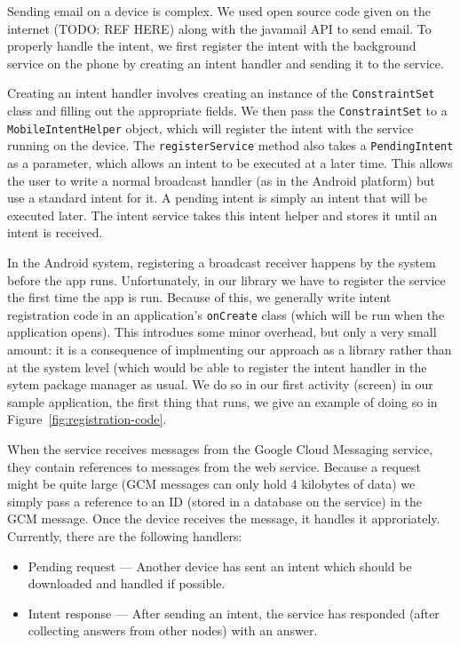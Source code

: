 \documentclass{acm_proc_article-sp}
\begin{document}
Sending email on a device is complex.  We used open source code given
on the internet (TODO: REF HERE) along with the javamail API to send
email.  To properly handle the intent, we first register the intent
with the background service on the phone by creating an intent handler
and sending it to the service.

Creating an intent handler involves creating an instance of the
\texttt{ConstraintSet} class and filling out the appropriate fields.
We then pass the \texttt{ConstraintSet} to a
\texttt{MobileIntentHelper} object, which will register the intent
with the service running on the device.  The \texttt{registerService}
method also takes a \texttt{PendingIntent} as a parameter, which
allows an intent to be executed at a later time.  This allows the user
to write a normal broadcast handler (as in the Android platform) but
use a standard intent for it.  A pending intent is simply an intent
that will be executed later.  The intent service takes this intent
helper and stores it until an intent is received.

In the Android system, registering a broadcast receiver happens by the
system before the app runs.  Unfortunately, in our library we have to
register the service the first time the app is run.  Because of this,
we generally write intent registration code in an application's
\texttt{onCreate} class (which will be run when the application
opens).  This introdues some minor overhead, but only a very small
amount: it is a consequence of implmenting our approach as a library
rather than at the system level (which would be able to register the
intent handler in the sytem package manager as usual.  We do so in our
first activity (screen) in our sample application, the first thing
that runs, we give an example of doing so in
Figure~\ref{fig:registration-code}.

When the service receives messages from the Google Cloud Messaging
service, they contain references to messages from the web service.
Because a request might be quite large (GCM messages can only hold 4
kilobytes of data) we simply pass a reference to an ID (stored in a
database on the service) in the GCM message.  Once the device receives
the message, it handles it approriately.  Currently, there are the
following handlers:

\begin{itemize}
\item Pending request --- Another device has sent an intent which
  should be downloaded and handled if possible.
\item Intent response --- After sending an intent, the service has
  responded (after collecting answers from other nodes) with an
  answer.
\end{itemize}
\end{document}
